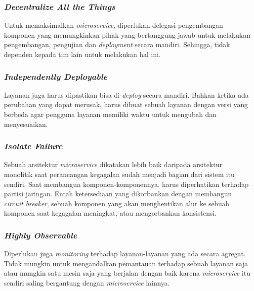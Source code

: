 {{{{\subsubsection{\emph{Decentralize All the Things}}
Untuk memaksimalkan \emph{microservice}, diperlukan delegasi pengembangan komponen yang memungkinkan pihak yang bertanggung jawab untuk melakukan pengembangan, pengujian dan \emph{deployment} secara mandiri. Sehingga, tidak dependen kepada tim lain untuk melakukan hal ini.

\subsubsection{\emph{Independently Deployable}}
Layanan juga harus dipastikan bisa di-\emph{deploy} secara mandiri. Bahkan ketika ada perubahan yang dapat merusak, harus dibuat sebuah layanan dengan versi yang berbeda agar pengguna layanan memiliki waktu untuk mengubah dan menyesuaikan.

\subsubsection{\emph{Isolate Failure}}
Sebuah arsitektur \emph{microservice} dikatakan lebih baik daripada arsitektur monolitik saat perancangan kegagalan sudah menjadi bagian dari sistem itu sendiri. Saat membangun komponen-komponennya, harus diperhatikan terhadap partisi jaringan. Entah ketersediaan yang dikorbankan dengan membangun \emph{circuit breaker}, sebuah komponen yang akan menghentikan alur ke sebuah komponen saat kegagalan meningkat, atau mengorbankan konsistensi.

\subsubsection{\emph{Highly Observable}}
Diperlukan juga \emph{monitoring} terhadap layanan-layanan yang ada secara agregat. Tidak mungkin untuk mengandalkan pemantauan terhadap sebuah layanan saja atau mungkin satu mesin saja yang berjalan dengan baik karena \emph{microservice} itu sendiri saling bergantung dengan \emph{microservice} lainnya.

}}}}
